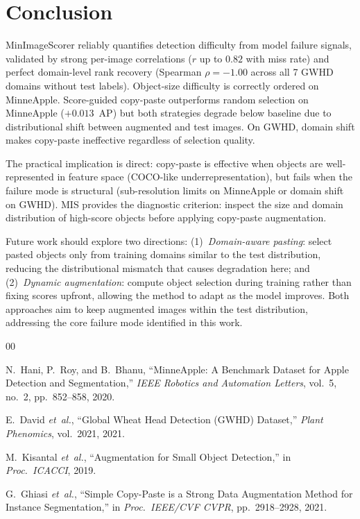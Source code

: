 \documentclass[conference]{IEEEtran}
\begin{document}
\section{Conclusion}

MinImageScorer reliably quantifies detection difficulty from model
failure signals, validated by strong per-image correlations ($r$ up to
$0.82$ with miss rate) and perfect domain-level rank recovery (Spearman
$\rho{=}{-}1.00$ across all 7 GWHD domains without test labels).
Object-size difficulty is correctly ordered on MinneApple. Score-guided
copy-paste outperforms random selection on MinneApple ($+0.013$~AP) but
both strategies degrade below baseline due to distributional shift
between augmented and test images. On GWHD, domain shift makes
copy-paste ineffective regardless of selection quality.

The practical implication is direct: copy-paste is effective when objects
are well-represented in feature space (COCO-like underrepresentation), but
fails when the failure mode is structural (sub-resolution limits on
MinneApple or domain shift on GWHD). MIS provides the diagnostic criterion:
inspect the size and domain distribution of high-score objects before
applying copy-paste augmentation.

Future work should explore two directions: (1)~\textit{Domain-aware
pasting}: select pasted objects only from training domains similar to the
test distribution, reducing the distributional mismatch that causes
degradation here; and (2)~\textit{Dynamic augmentation}: compute object
selection during training rather than fixing scores upfront, allowing the
method to adapt as the model improves. Both approaches aim to keep
augmented images within the test distribution, addressing the core failure
mode identified in this work.

\begin{thebibliography}{00}

N.~Hani, P.~Roy, and B.~Bhanu,
``MinneApple: A Benchmark Dataset for Apple Detection and
Segmentation,''
\textit{IEEE Robotics and Automation Letters},
vol.~5, no.~2, pp.~852--858, 2020.

E.~David \textit{et~al.},
``Global Wheat Head Detection (GWHD) Dataset,''
\textit{Plant Phenomics}, vol.~2021, 2021.

M.~Kisantal \textit{et~al.},
``Augmentation for Small Object Detection,''
in \textit{Proc.\ ICACCI}, 2019.

G.~Ghiasi \textit{et~al.},
``Simple Copy-Paste is a Strong Data Augmentation Method
for Instance Segmentation,''
in \textit{Proc.\ IEEE/CVF CVPR}, pp.~2918--2928, 2021.

\end{thebibliography}
\end{document}
